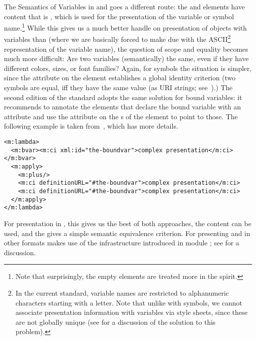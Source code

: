 \begin{omgroup}[id=mobj,short=Mathematical Objects]
\begin{module}[id=omml-semvar]
\begin{omgroup}[id=sem-var,short=Semantics of Variables]{The Semantics of Variables in
  {\openmath} and {\cmathml}}
{\mathml} goes a different route: the {} and {}
elements have content that is {\pmathml}, which is used for the presentation of the
variable or symbol name.\footnote{Note that surprisingly, the empty {\cmathml} elements
  are treated more in the {\openmath} spirit.}  While this gives us a much better handle
on presentation of objects with variables than {\openmath} (where we are basically forced
to make due with the ASCII\footnote{In the current {\openmath} standard, variable names
  are restricted to alphanumeric characters starting with a letter. Note that unlike with
  symbols, we cannot associate presentation information with variables via style sheets,
  since these are not globally unique (see {} for a discussion of the
  {\omdoc} solution to this problem).}  representation of the variable name), the question
of scope and equality becomes much more difficult: Are two variables (semantically) the
same, even if they have different colors, sizes, or font families? Again, for symbols the
situation is simpler, since the {} attribute on the
{} element establishes a global identity criterion (two symbols are
equal, iff they have the same {} value (as URI
strings; see~\cite{BerFie:uri98}).) The second edition of the {\mathml} standard adopts
the same solution for bound variables: it recommends to annotate the {}
elements that declare the bound variable with an {} attribute and
use the {} attribute on the {s}
of the {} element to point to those. The following example is taken
from~\cite{KohDev:bvm03}, which has more details.

\begin{lstlisting}[language=MathML,label=bvar-mathml,
     index={math,bvar,ci,definitionURL}]
<m:lambda>
  <m:bvar><m:ci xml:id="the-boundvar">complex presentation</m:ci></m:bvar>
  <m:apply>
    <m:plus/>
    <m:ci definitionURL="#the-boundvar">complex presentation</m:ci>
    <m:ci definitionURL="#the-boundvar">complex presentation</m:ci>
  </m:apply>
</m:lambda>  
\end{lstlisting}

For presentation in {\mathml}, this gives us the best of both approaches, the
{} content can be used, and the {} gives a simple
semantic equivalence criterion. For presenting {\openmath} and {\cmathml} in other
formats {\omdoc} makes use of the infrastructure introduced in module
{}; see {} for a discussion.
\end{omgroup}
\end{module}


\end{omgroup}
